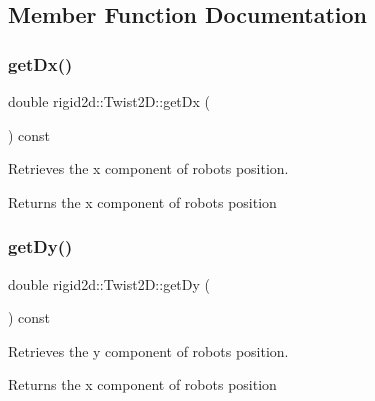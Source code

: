 \subsection{Member Function Documentation}
\mbox{\label{classrigid2d_1_1Twist2D_a1858b9ff8ceefd361a948fab83860ebe}} 
\subsubsection{\texorpdfstring{get\+Dx()}{getDx()}}
{\footnotesize\ttfamily double rigid2d\+::\+Twist2\+D\+::get\+Dx (\begin{DoxyParamCaption}{ }\end{DoxyParamCaption}) const}



Retrieves the x component of robot\textquotesingle{}s position. 

\begin{DoxyReturn}{Returns}
the x component of robot\textquotesingle{}s position 
\end{DoxyReturn}
\mbox{\label{classrigid2d_1_1Twist2D_aff295b650a5b848b74ab5d15436efb8a}} 
\subsubsection{\texorpdfstring{get\+Dy()}{getDy()}}
{\footnotesize\ttfamily double rigid2d\+::\+Twist2\+D\+::get\+Dy (\begin{DoxyParamCaption}{ }\end{DoxyParamCaption}) const}



Retrieves the y component of robot\textquotesingle{}s position. 

\begin{DoxyReturn}{Returns}
the x component of robot\textquotesingle{}s position 
\end{DoxyReturn}
\mbox{\label{classrigid2d_1_1Twist2D_abf67b8c02aad46cdcd83936037e1c99a}} 
